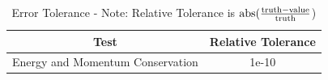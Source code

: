 \begin{table}[htbp]
	\caption{Error Tolerance - Note: Relative Tolerance is $\textnormal{abs}(\frac{\textnormal{truth} - \textnormal{value}}{\textnormal{truth}}$)}
	\label{tab:errortol}
	\centering \fontsize{10}{10}\selectfont
	\begin{tabular}{| c | c |} %
		\hline
		Test   & Relative Tolerance \\
		\hline
		Energy and Momentum Conservation & 1e-10 \\
		\hline
	\end{tabular}
\end{table}

%
%
%
%
%
%
%
%
%
%
%
\clearpage
